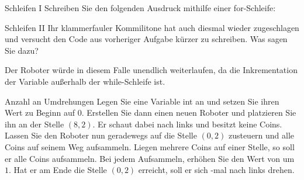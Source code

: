 \documentclass{../preamble}
\begin{document}
\clearpage

\begin{task}[credit = \stars{1}{3}]{Schleifen I}
    Schreiben Sie den folgenden Ausdruck mithilfe einer \textcolor{keywordcolor}{for}-Schleife:
    

    \begin{solution}
        
    \end{solution}
\end{task}

\begin{task}[credit = \stars{1}{3}]{Schleifen II}
    Ihr klammerfauler Kommilitone hat auch diesmal wieder zugeschlagen und versucht den Code aus vorheriger Aufgabe kürzer zu schreiben. Was sagen Sie dazu?
    

    \begin{solution}
        Der Roboter würde in diesem Falle unendlich weiterlaufen, da die Inkrementation der Variable  außerhalb der \textcolor{keywordcolor}{while}-Schleife ist.
    \end{solution}
\end{task}

\clearpage

\begin{task}[credit = \stars{2}{3}]{Anzahl an Umdrehungen}
    Legen Sie eine Variable \textcolor{keywordcolor}{int}  an und setzen Sie ihren Wert zu Beginn auf \(0\). Erstellen Sie dann einen neuen Roboter und platzieren Sie ihn an der Stelle \((8,2)\). Er schaut dabei nach links und besitzt keine Coins. Lassen Sie den Roboter nun geradewegs auf die Stelle \((0,2)\) zusteuern und alle Coins auf seinem Weg aufsammeln. Liegen mehrere Coins auf einer Stelle, so soll er alle Coins aufsammeln. Bei jedem Aufsammeln, erhöhen Sie den Wert von  um \(1\). Hat er am Ende die Stelle \((0,2)\) erreicht, soll er sich -mal nach links drehen.

    \begin{solution}
        
    \end{solution}
\end{task}
\end{document}
